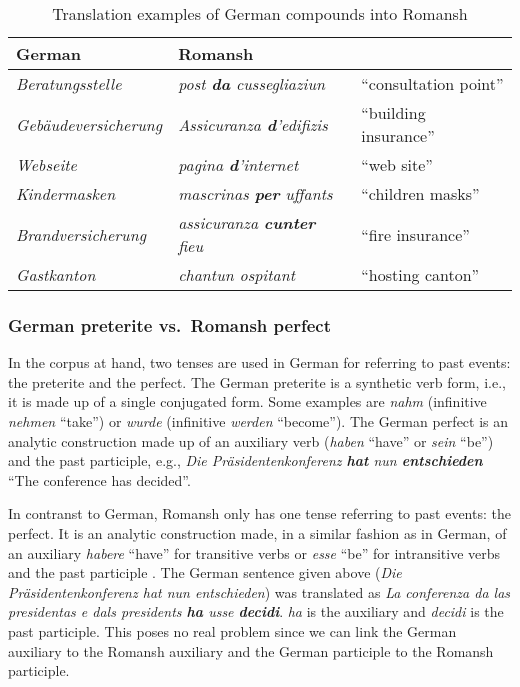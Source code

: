 \begin{table}
	\begin{center}
	\begin{tabular}{lll}
		\toprule
		German & Romansh &  \\
		\midrule
		\emph{Beratungsstelle} & \emph{post \textbf{da} cussegliaziun} & \enquote{consultation point} \\
		\emph{Gebäudeversicherung} & \emph{Assicuranza \textbf{d}'edifizis} & \enquote{building insurance} \\
		\emph{Webseite} & \emph{pagina \textbf{d}'internet} & \enquote{web site} \\
		\emph{Kindermasken} & \emph{mascrinas \textbf{per} uffants} & \enquote{children masks} \\
		\emph{Brandversicherung} & \emph{assicuranza \textbf{cunter} fieu} & \enquote{fire insurance} \\
		\emph{Gastkanton} & \emph{chantun ospitant} & \enquote{hosting canton} \\
		\bottomrule
	\end{tabular}
	\caption{Translation examples of German compounds into Romansh}
	\label{tab:compounds}
	\end{center}
\end{table}

\subsubsection{German preterite vs.~Romansh perfect}
In the corpus at hand, two tenses are used in German for referring to past events: the preterite and the perfect. 
The German preterite is a synthetic verb form, i.e., it is made up of a single conjugated form. 
Some examples are \emph{nahm} (infinitive \emph{nehmen} \enquote{take}) or \emph{wurde} (infinitive \emph{werden} \enquote{become}). 
The German perfect is an analytic construction made up of an auxiliary verb (\emph{haben} \enquote{have} or \emph{sein} \enquote{be}) and the past participle, e.g., \emph{Die Präsidentenkonferenz \textbf{hat} nun \textbf{entschieden}} \enquote{The conference has decided}. 

In contranst to German, Romansh only has one tense referring to past events: the perfect. 
It is an analytic construction made, in a similar fashion as in German, of an auxiliary \emph{habere} \enquote{have} for transitive verbs or \emph{esse} \enquote{be} for intransitive verbs and the past participle \autocite[189]{bossong2008}. 
The German sentence given above (\emph{Die Präsidentenkonferenz hat nun entschieden}) was translated as \emph{La conferenza da las presidentas e dals presidents \textbf{ha} usse \textbf{decidi}}. 
\emph{ha} is the auxiliary and \emph{decidi} is the past participle. 
This poses no real problem since we can link the German auxiliary to the Romansh auxiliary and the German participle to the Romansh participle.

